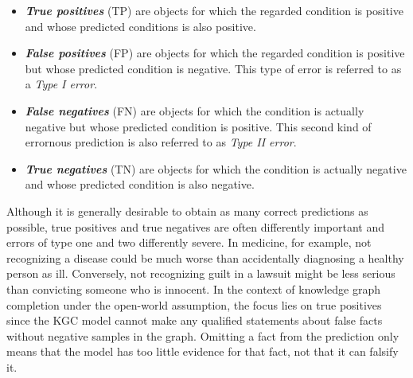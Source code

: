 \begin{itemize}
    \item \textbf{\emph{True positives}} (TP) are objects for which the regarded condition is positive and whose predicted conditions is also positive.

    \item \textbf{\emph{False positives}} (FP) are objects for which the regarded condition is positive but whose predicted condition is negative. This type of error is referred to as a \emph{Type I error}.

    \item \textbf{\emph{False negatives}} (FN) are objects for which the condition is actually negative but whose predicted condition is positive. This second kind of errornous prediction is also referred to as \emph{Type II error}.

    \item \textbf{\emph{True negatives}} (TN) are objects for which the condition is actually negative and whose predicted condition is also negative.
\end{itemize}

Although it is generally desirable to obtain as many correct predictions as possible, true positives and true negatives are often differently important and errors of type one and two differently severe. In medicine, for example, not recognizing a disease could be much worse than accidentally diagnosing a healthy person as ill. Conversely, not recognizing guilt in a lawsuit might be less serious than convicting someone who is innocent. In the context of knowledge graph completion under the open-world assumption, the focus lies on true positives since the KGC model cannot make any qualified statements about false facts without negative samples in the graph. Omitting a fact from the prediction only means that the model has too little evidence for that fact, not that it can falsify it.


%

